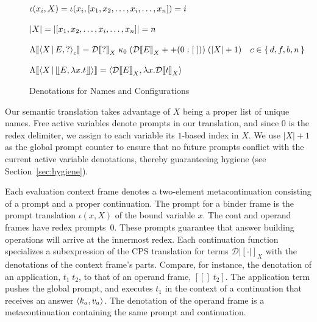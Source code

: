 \documentclass{LMCS}
\newenvironment{boxedarray}[1]
  {\begin{lrbox}{\saveboxedarray}\begin{math}\begin{array}{#1}}
  {\end{array}\end{math}\end{lrbox}\fbox{\usebox{\saveboxedarray}}}
\theoremstyle{plain}
\theoremstyle{remark}
\newcommand{\answer}[1]{\llfloor#1\rrfloor}
\begin{document}
\begin{figure}[t]
  \centering\small
  \begin{boxedarray}{@{}l@{}}
      \iota (x_i,X) = \iota(x_i,[x_1,x_2,\dots,x_i,\dots,x_n])  =  i  \\ \\
      \lvert X \rvert = \lvert [x_1,x_2,\dots,x_i,\dots,x_n] \rvert  =  n  \\ \\
      \Lambda |[\Braket{X|E,?}_c |]  = 
      \mathcal{D}|[ ? |]_X \; \kappa_0 \; (\mathcal{D}|[ E |]_X ++ (0:[\;])) \;
      (\lvert X \rvert + 1)  \quad c\in\set{d,f,b,n} \\ \\
      \Lambda |[\Braket{X|\answer{E,\lambda x.t}}|] = 
      \braket{\mathcal{D}|[ E |]_X,\lambda x.\mathcal{D}|[ t |]_X}

    \end{boxedarray}
   \caption{Denotations for Names and Configurations}
  \label{fig:cbn-denote-misc}
\end{figure}

Our semantic translation takes advantage of $X$ being a proper list of unique
names.  Free active variables denote prompts in our translation, and since $0$
is the redex delimiter, we assign to each variable its $1$-based index in $X$.
We use $\lvert X \rvert + 1$ as the global prompt counter to ensure that no
future prompts conflict with the current active variable denotations, thereby
guaranteeing hygiene (see Section~\ref{sec:hygiene}).


Each evaluation context frame denotes a two-element metacontinuation consisting
of a prompt and a proper continuation.  The prompt for a binder frame is the
prompt translation $\iota(x,X)$ of the bound variable $x$.  The cont and
operand frames have redex prompts~$0$.  These prompts guarantee that answer
building operations will arrive at the innermost redex.  Each continuation
function specializes a subexpression of the CPS translation for terms
$\mathcal{D}|[\cdot|]_X$ with the denotations of the context frame's parts.  Compare, for
instance, the denotation of an application, $t_1\;t_2$, to that of an operand
frame, $[[]\;t_2]$.  The application term pushes the global prompt, and
executes $t_1$ in the context of a continuation that receives an answer
$\Braket{k_a,v_a}$.  The denotation of the operand frame is a metacontinuation
containing the same prompt and continuation.
\end{document}

